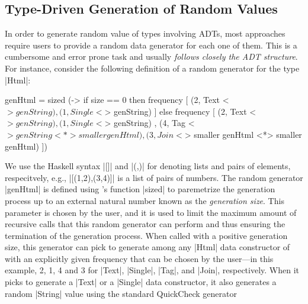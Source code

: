 

\subsection*{\textbf{Type-Driven Generation of Random Values}}

In order to generate random value of types involving ADTs, most approaches
require users to provide a random data generator for each one of them.
%
This is a cumbersome and error prone task and usually \emph{follows closely the ADT
structure}.
%
For instance, consider the following definition of a \quickcheck random
generator for the type |Html|:
%
\begin{code}
genHtml = sized (\size ->
   if size == 0  then  frequency
                       [ (2,  Text    <$> genString)
                       , (1,  Single  <$> genString) ]
   else frequency
     [  (2,  Text    <$> genString)
     ,  (1,  Single  <$> genString)
     ,  (4,  Tag     <$> genString <*> smaller genHtml)
     ,  (3,  Join    <$> smaller genHtml <*> smaller genHtml) ])
\end{code} %
%
We use the Haskell syntax |[]| and |(,)| for denoting lists and pairs of
elements, respecitvely, e.g., |[(1,2),(3,4)]| is a list of pairs of numbers.
%
The random generator |genHtml| is defined using \quickcheck's function |sized|
to paremetrize the generation process up to an external natural number known as
the \emph{generation size}.
%
This parameter is chosen by the user, and it is used to limit the maximum amount
of recursive calls that this random generator can perform and thus ensuring
the termination of the generation process.
%
When called with a positive generation size, this generator can pick to generate
among any |Html| data constructor of with an explicitly given frequency that can
be chosen by the user---in this example, 2, 1, 4 and 3 for |Text|, |Single|,
|Tag|, and |Join|, respectively.
%
When it picks to generate a |Text| or a |Single| data constructor, it also
generates a random |String| value using the standard QuickCheck generator
